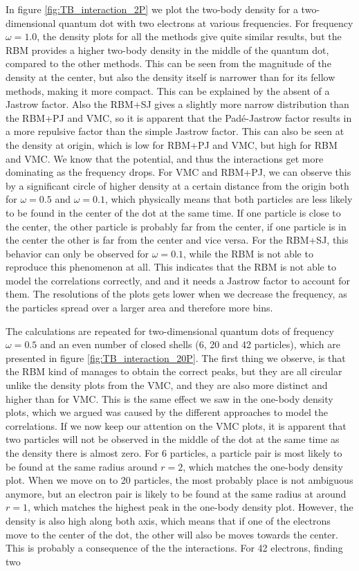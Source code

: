 In figure \eqref{fig:TB_interaction_2P} we plot the two-body density for a two-dimensional quantum dot with two electrons at various frequencies. For frequency $\omega=1.0$, the density plots for all the methods give quite similar results, but the RBM provides a higher two-body density in the middle of the quantum dot, compared to the other methods. This can be seen from the magnitude of the density at the center, but also the density itself is narrower than for its fellow methods, making it more compact. This can be explained by the absent of a Jastrow factor. Also the RBM+SJ gives a slightly more narrow distribution than the RBM+PJ and VMC, so it is apparent that the Padé-Jastrow factor results in a more repulsive factor than the simple Jastrow factor. This can also be seen at the density at origin, which is low for RBM+PJ and VMC, but high for RBM and VMC. We know that the potential, and thus the interactions get more dominating as the frequency drops. For VMC and RBM+PJ, we can observe this by a significant circle of higher density at a certain distance from the origin both for $\omega=0.5$ and $\omega=0.1$, which physically means that both particles are less likely to be found in the center of the dot at the same time. If one particle is close to the center, the other particle is probably far from the center, if one particle is in the center the other is far from the center and vice versa. For the RBM+SJ, this behavior can only be observed for $\omega=0.1$, while the RBM is not able to reproduce this phenomenon at all. This indicates that the RBM is not able to model the correlations correctly, and and it needs a Jastrow factor to account for them. The resolutions of the plots gets lower when we decrease the frequency, as the particles spread over a larger area and therefore more bins.

The calculations are repeated for two-dimensional quantum dots of frequency $\omega=0.5$ and an even number of closed shells (6, 20 and 42 particles), which are presented in figure \eqref{fig:TB_interaction_20P}. The first thing we observe, is that the RBM kind of manages to obtain the correct peaks, but they are all circular unlike the density plots from the VMC, and they are also more distinct and higher than for VMC. This is the same effect we saw in the one-body density plots, which we argued was caused by the different approaches to model the correlations. If we now keep our attention on the VMC plots, it is apparent that two particles will not be observed in the middle of the dot at the same time as the density there is almost zero. For 6 particles, a particle pair is most likely to be found at the same radius around $r=2$, which matches the one-body density plot. When we move on to 20 particles, the most probably place is not ambiguous anymore, but an electron pair is likely to be found at the same radius at around $r=1$, which matches the highest peak in the one-body density plot. However, the density is also high along both axis, which means that if one of the electrons move to the center of the dot, the other will also be moves towards the center. This is probably a consequence of the the interactions. For 42 electrons, finding two 

